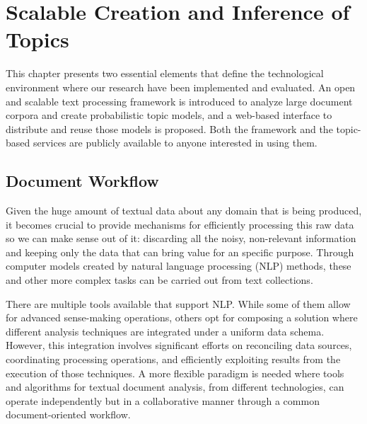 

\chapter{Scalable Creation and Inference of Topics}\label{ch:scalability}

\graphicspath{{scalability/figures/}}


This chapter presents two essential elements that define the technological environment where our research have been implemented and evaluated. An open and scalable text processing framework is introduced to analyze large document corpora and create probabilistic topic models, and a web-based interface to distribute and reuse those models is proposed. Both the framework and the topic-based services are publicly available to anyone interested in using them.


\section{Document Workflow}

Given the huge amount of textual data about any domain that is being produced, it becomes crucial to provide mechanisms for efficiently processing this raw data so we can make sense out of it: discarding all the noisy, non-relevant information and keeping only the data that can bring value for an specific purpose. Through computer models created by natural language processing (NLP) methods, these and other more complex tasks can be carried out from text collections\cite{Jurafsky2000SpeechAL}. 

There are multiple tools available that support NLP. While some of them allow for advanced sense-making operations, others opt for composing a solution where different analysis techniques are integrated under a uniform data schema. However, this integration involves significant efforts on reconciling data sources, coordinating processing operations, and efficiently exploiting results from the execution of those techniques. A more flexible paradigm is needed where tools and algorithms for textual document analysis, from different technologies, can operate independently but in a collaborative manner through a common document-oriented workflow. 

